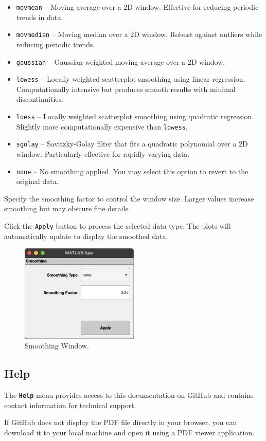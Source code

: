 \begin{itemize}
    \item \texttt{movmean} -- Moving average over a 2D window. Effective for reducing periodic trends in data.
    
    \item \texttt{movmedian} -- Moving median over a 2D window. Robust against outliers while reducing periodic trends.
    
    \item \texttt{gaussian} -- Gaussian-weighted moving average over a 2D window.
    
    \item \texttt{lowess} -- Locally weighted scatterplot smoothing using linear regression. Computationally intensive but produces smooth results with minimal discontinuities.
    
    \item \texttt{loess} -- Locally weighted scatterplot smoothing using quadratic regression. Slightly more computationally expensive than \texttt{lowess}.
    
    \item \texttt{sgolay} -- Savitzky-Golay filter that fits a quadratic polynomial over a 2D window. Particularly effective for rapidly varying data.
    
    \item \texttt{none} -- No smoothing applied. You may select this option to revert to the original data.
\end{itemize}

\noindent Specify the smoothing factor to control the window size. Larger values increase smoothing but may obscure fine details.

Click the \texttt{Apply} button to process the selected data type. The plots will automatically update to display the smoothed data.

\begin{figure}[H]
    \centering
    \includegraphics[width=0.5\textwidth]{figs/smoothing.png}
    \caption{Smoothing Window.}
    \label{fig:smoothing}
\end{figure}

\subsection{Help}
The \textbf{\texttt{Help}} menu provides access to this documentation on GitHub and contains contact information for technical support.

If GitHub does not display the PDF file directly in your browser, you can download it to your local machine and open it using a PDF viewer application.